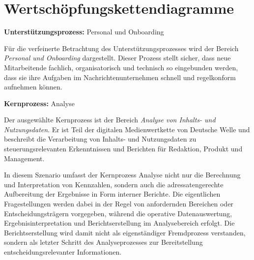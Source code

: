 \documentclass[11pt,a4paper]{article}
\newcommand{\companyname}{Deutsche Welle}
\begin{document}
\clearpage
\section{Wertsch\"opfungskettendiagramme}

\textbf{Unterst\"utzungsprozess:} Personal und Onboarding

F\"ur die verfeinerte Betrachtung des Unterst\"utzungsprozesses wird der Bereich
\emph{Personal und Onboarding} dargestellt. Dieser Prozess stellt sicher, dass neue Mitarbeitende
fachlich, organisatorisch und technisch so eingebunden werden, dass sie ihre Aufgaben im
Nachrichtenunternehmen schnell und regelkonform aufnehmen k\"onnen.

\begin{center}
\end{center}

\vspace{0.8em}
\textbf{Kernprozess:} Analyse

Der ausgew\"ahlte Kernprozess ist der Bereich \emph{Analyse von Inhalts- und Nutzungsdaten}. Er ist Teil der digitalen
Medienwertkette von \companyname{} und beschreibt die Verarbeitung von Inhalts- und
Nutzungsdaten zu steuerungsrelevanten Erkenntnissen und Berichten f\"ur Redaktion, Produkt
und Management.

In diesem Szenario umfasst der Kernprozess Analyse nicht nur die Berechnung und Interpretation
von Kennzahlen, sondern auch die adressatengerechte Aufbereitung der Ergebnisse in Form
interner Berichte. Die eigentlichen Fragestellungen werden dabei in der Regel von anfordernden
Bereichen oder Entscheidungstr\"agern vorgegeben, w\"ahrend die operative Datenauswertung,
Ergebnisinterpretation und Berichtserstellung im Analysebereich erfolgt. Die Berichtserstellung wird
damit nicht als eigenst\"andiger Fremdprozess verstanden, sondern als letzter Schritt des
Analyseprozesses zur Bereitstellung entscheidungsrelevanter Informationen.
\end{document}
